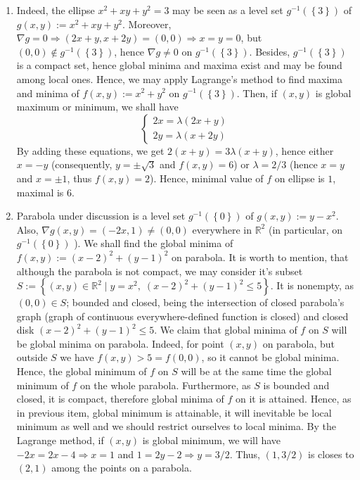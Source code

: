 \documentclass[8pt]{article} %
\newcommand{\myset}[1]{\left\{#1\right\}}
\begin{document}
\begin{enumerate}
{	\begin{enumerate}[label=(\alph*)]
		\item{Indeed, the ellipse $x^2+xy+y^2=3$ may be seen as a level set $g^{-1}(\myset{3})$ of $g(x,y):=x^2+xy+y^2$. Moreover, $\nabla g=0\Rightarrow(2x+y,x+2y)=(0,0)
			\Rightarrow x=y=0$, but $(0,0)\notin g^{-1}(\myset{3})$, hence $\nabla g\neq 0$ on $g^{-1}(\myset{3})$. Besides, $g^{-1}(\myset{3})$ is a compact set, hence global minima and
			maxima exist and may be found among local ones. Hence, we may apply Lagrange's method to find maxima and minima of $f(x,y):=x^2+y^2$ on $g^{-1}(\myset{3})$.
			Then, if $(x,y)$ is global maximum or minimum, we shall have
			\[
			\begin{cases}
				2x=\lambda(2x+y)\\
				2y=\lambda(x+2y)
			\end{cases}
			\]
			By adding these equations, we get $2(x+y)=3\lambda(x+y)$, hence either $x=-y$ (consequently, $y=\pm\sqrt{3}$ and $f(x,y)=6$) or $\lambda=2/3$ (hence
			$x=y$ and $x=\pm1$, thus $f(x,y)=2$). Hence, minimal value of $f$ on ellipse is $1$, maximal is $6$.	
			}
		\item{Parabola under discussion
			is a level set $g^{-1}(\myset{0})$ of $g(x,y):=y-x^2$. Also, $\nabla g(x,y)=(-2x,1)\neq (0,0)$ everywhere in $\mathbb{R}^2$ (in particular, on $g^{-1}(\myset{0})$
			). We shall find the global minima of $f(x,y):=(x-2)^2+(y-1)^2$ on parabola. It is worth to mention, that although the parabola is not compact,
			we may consider it's subset $S:=\myset{(x,y)\in\mathbb{R}^2\mid y=x^2,\;(x-2)^2+(y-1)^2\leq 5}$. It is nonempty, as $(0,0)\in S$; 
			bounded and closed, being the intersection of closed parabola's graph (graph of continuous everywhere-defined function is closed)
			and closed disk $(x-2)^2+(y-1)^2\leq 5$. We claim that global minima of $f$ on $S$ will be global minima on
			parabola. Indeed, for point $(x,y)$ on parabola, but outside
			$S$ we have $f(x,y)>5=f(0,0)$, so it cannot be global minima. Hence, the global minimum of $f$ on $S$ will be at the same time the global minimum 
			of $f$ on the whole parabola.
			Furthermore, as $S$ is bounded and closed, it is compact, therefore global minima
			of $f$ on it is attained. Hence, as in previous item, global minimum is attainable, it will inevitable be local minimum as well and we should restrict
			ourselves to local minima. By the Lagrange method, if $(x,y)$ is global minimum, we will have $-2x=2x-4\Rightarrow x=1$ and $1=2y-2\Rightarrow y=3/2$.
			Thus, $(1,3/2)$ is closes to $(2,1)$ among the points on a parabola.
}
\end{enumerate}}
\end{enumerate}
\end{document}
